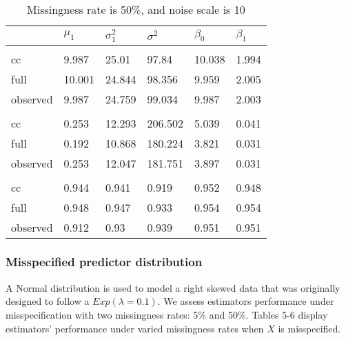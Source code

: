 \documentclass[
  twocolumn]{article}
\begin{document}
\begin{table}[h]
\caption{Missingness rate is 50\%, and noise scale is 10}
\begingroup\fontsize{7}{9}\selectfont

\begin{tabu} to 
\toprule
 & $\mu_1$ & $\sigma^2_1$ & $\sigma^2$ & $\beta_0$ & $\beta_1$\\
\midrule
\addlinespace[0.3em]
\\
\hspace{1em}cc & 9.987 & 25.01 & 97.84 & 10.038 & 1.994\\
\hspace{1em}full & 10.001 & 24.844 & 98.356 & 9.959 & 2.005\\
\hspace{1em}observed & 9.987 & 24.759 & 99.034 & 9.987 & 2.003\\
\addlinespace[0.3em]
\\
\hspace{1em}cc & 0.253 & 12.293 & 206.502 & 5.039 & 0.041\\
\hspace{1em}full & 0.192 & 10.868 & 180.224 & 3.821 & 0.031\\
\hspace{1em}observed & 0.253 & 12.047 & 181.751 & 3.897 & 0.031\\
\addlinespace[0.3em]
\\
\hspace{1em}cc & 0.944 & 0.941 & 0.919 & 0.952 & 0.948\\
\hspace{1em}full & 0.948 & 0.947 & 0.933 & 0.954 & 0.954\\
\hspace{1em}observed & 0.912 & 0.93 & 0.939 & 0.951 & 0.951\\
\bottomrule
\end{tabu}
\endgroup{}
\end{table}

\hypertarget{misspecified-predictor-distribution}{%
\subsubsection{Misspecified predictor
distribution}\label{misspecified-predictor-distribution}}

A Normal distribution is used to model a right skewed data that was
originally designed to follow a \(Exp(\lambda = 0.1)\). We assess
estimators performance under misspecification with two missingness
rates: 5\% and 50\%. Tables 5-6 display estimators' performance under
varied missingness rates when \(X\) is misspecified.
\end{document}
